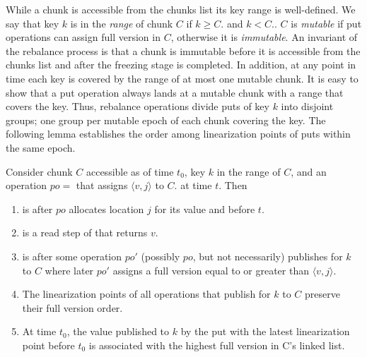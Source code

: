 While a chunk is accessible from the chunks list its key range is well-defined.
We say that key $k$ is in the \emph{range} of chunk $C$ if $k \geq C$. and $k < C.$.
$C$ is \emph{mutable} if put operations can assign full version in $C$, otherwise it is \emph{immutable}.
An invariant of the rebalance process is that 
a chunk is immutable before it is accessible from the chunks list and after the freezing stage is completed. 
In addition, at any point in time each key is covered by the range of at most one mutable chunk. 
It is easy to show that a put operation always lands at a mutable chunk with a range that covers the key.
Thus, rebalance operations divide puts of key $k$ into disjoint groups; one group per mutable epoch of each chunk covering the key.
The following lemma 
establishes the order among linearization points of puts within the same epoch.
\begin{lemma}
\label{proof:put}
Consider chunk $C$ accessible as of time $t_0$, key $k$ in the range of $C$, and an
operation $po=$ that assigns $\langle v, j\rangle$ to $C$. at time $t$. Then  
\begin{enumerate}
\setlength{\itemsep}{0pt}
\setlength{\parskip}{0pt}
\item \label{proof:put:lp1}  is after $po$ allocates location $j$ for its value and before $t$.
\item \label{proof:put:lp2}  is a read step of  that returns $v$.
\item \label{proof:put:lp3}  is after some operation $po'$ (possibly $po$, but not necessarily) publishes for $k$ to $C$ where later $po'$ assigns a full version equal to or greater than $\langle v, j\rangle$.
\item \label{proof:put:lp4} The linearization points of all operations that publish for $k$ to $C$ preserve their full version order.
\item \label{proof:put:lp5} At time $t_0$, the value published to $k$ by the put with the latest linearization point before $t_0$ is associated with the highest full version in C's linked list.
\end{enumerate}
\end{lemma}




